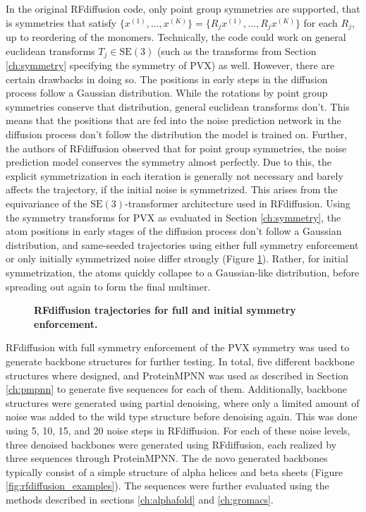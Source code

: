 In the original RFdiffusion code, only point group symmetries are supported, that is symmetries that satisfy $\{x^{(1)}, ..., x^{(K)}\} = \{R_j x^{(1)}, ..., R_j x^{(K)}\}$ for each $R_j$, up to reordering of the monomers. Technically, the code could work on general euclidean transforms $T_j \in \mathrm{SE}(3)$ (such as the transforms from Section \ref{ch:symmetry} specifying the symmetry of PVX) as well. However, there are certain drawbacks in doing so. The positions in early steps in the diffusion process follow a Gaussian distribution. While the rotations by point group symmetries conserve that distribution, general euclidean transforms don't. This means that the positions that are fed into the noise prediction network in the diffusion process don't follow the distribution the model is trained on. Further, the authors of RFdiffusion observed that for point group symmetries, the noise prediction model conserves the symmetry almost perfectly. Due to this, the explicit symmetrization in each iteration is generally not necessary and barely affects the trajectory, if the initial noise is symmetrized. This arises from the equivariance of the $\mathrm{SE}(3)$-transformer architecture used in RFdiffusion. Using the symmetry transforms for PVX as evaluated in Section \ref{ch:symmetry}, the atom positions in early stages of the diffusion process don't follow a Gaussian distribution, and same-seeded trajectories using either full symmetry enforcement or only initially symmetrized noise differ strongly (Figure \ref{fig:rfdiff_sym_trajectories}). Rather, for initial symmetrization, the atoms quickly collapse to a Gaussian-like distribution, before spreading out again to form the final multimer.

\begin{figure}[!hbtp]
    \centering
    
    \caption{\textbf{RFdiffusion trajectories for full and initial symmetry enforcement. }}
    \label{fig:rfdiff_sym_trajectories}
\end{figure}

\FloatBarrier

RFdiffusion with full symmetry enforcement of the PVX symmetry was used to generate backbone structures for further testing. In total, five different backbone structures where designed, and ProteinMPNN was used as described in Section \ref{ch:pmpnn} to generate five sequences for each of them. Additionally, backbone structures were generated using partial denoising, where only a limited amount of noise was added to the wild type structure before denoising again. This was done using 5, 10, 15, and 20 noise steps in RFdiffusion. For each of these noise levels, three denoised backbones were generated using RFdiffusion, each realized by three sequences through ProteinMPNN. The de novo generated backbones typically consist of a simple structure of alpha helices and beta sheets (Figure \ref{fig:rfdiffusion_examples}). The sequences were further evaluated using the methods described in sections \ref{ch:alphafold} and \ref{ch:gromacs}.


